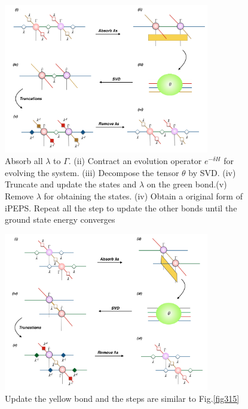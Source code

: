 \begin{figure}[ht]
	\centering
	\includegraphics[width=0.80\textwidth]{figures/fig315.png}
	\caption[The tensor network diagrams of updating the green bond in iPEPS with 2D-iTEBD]{Absorb all $\lambda$ to $\Gamma$. (ii) Contract an evolution operator $e^{-\delta H}$ for evolving the system. (iii) Decompose the tensor $\theta$ by SVD. (iv) Truncate and update the states and $\lambda$ on the green bond.(v) Remove $\lambda$ for obtaining the states. (iv) Obtain a original form of iPEPS. Repeat all the step to update the other bonds until the ground state energy converges}
	\label{fig316}
\end{figure}

	\begin{figure}[ht]
	\centering
	\includegraphics[width=0.80\textwidth]{figures/fig316.png}
	\caption[The tensor network diagrams of updating the yellow bond in iPEPS with 2D-iTEBD]{Update the yellow bond and the steps are similar to Fig.\ref{fig315}}
	\label{fig317}
	\end{figure}


